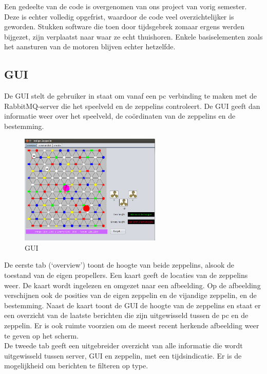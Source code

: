 \documentclass[eind]{penoverslag}
\begin{document}
Een gedeelte van de code is overgenomen van ons project van vorig semester. Deze is echter volledig opgefrist, waardoor de code veel overzichtelijker is geworden. Stukken software die toen door tijdsgebrek zomaar ergens werden bijgezet, zijn verplaatst naar waar ze echt thuishoren. Enkele basiselementen zoals het aansturen van de motoren blijven echter hetzelfde.

\subsection{GUI}
De GUI stelt de gebruiker in staat om vanaf een pc verbinding te maken met de RabbitMQ-server die het speelveld en de zeppelins controleert. De GUI geeft dan informatie weer over het speelveld, de co\"{o}rdinaten van de zeppelins en de bestemming. \\

\begin{figure}[H]
\begin{center}
\includegraphics[width=0.6\textwidth]{GUI.png}
\end{center}
\caption{GUI}
\label{GUI}
\end{figure}

De eerste tab (`overview') toont de hoogte van beide zeppelins, alsook de toestand van de eigen propellers. Een kaart geeft de locaties van de zeppelins weer. De kaart wordt ingelezen en omgezet naar een afbeelding. Op de afbeelding verschijnen ook de posities van de eigen zeppelin en de vijandige zeppelin, en de bestemming. Naast de kaart toont de GUI de hoogte van de zeppelins en staat er een overzicht van de laatste berichten die zijn uitgewisseld tussen de pc en de zeppelin. Er is ook ruimte voorzien om de meest recent herkende afbeelding weer te geven op het scherm. \\

De tweede tab geeft een uitgebreider overzicht van alle informatie die wordt uitgewisseld tussen server, GUI en zeppelin, met een tijdsindicatie. Er is de mogelijkheid om berichten te filteren op type. \\
\end{document}
